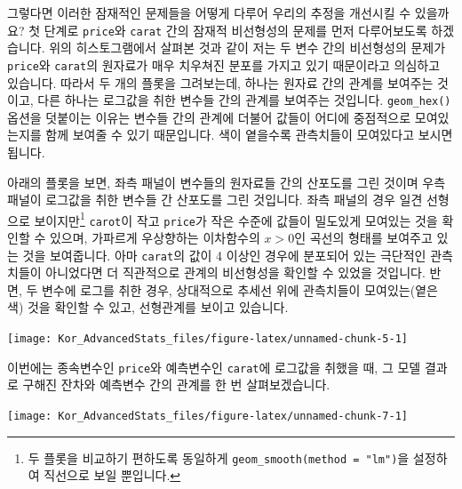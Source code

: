 \documentclass[
]{book}
\newenvironment{Shaded}{\begin{snugshade}}{\end{snugshade}}
\newcommand{\DataTypeTok}[1]{\textcolor[rgb]{0.13,0.29,0.53}{#1}}
\newcommand{\KeywordTok}[1]{\textcolor[rgb]{0.13,0.29,0.53}{\textbf{#1}}}
\newcommand{\NormalTok}[1]{#1}
\newcommand{\OperatorTok}[1]{\textcolor[rgb]{0.81,0.36,0.00}{\textbf{#1}}}
\newcommand{\StringTok}[1]{\textcolor[rgb]{0.31,0.60,0.02}{#1}}
\begin{document}
그렇다면 이러한 잠재적인 문제들을 어떻게 다루어 우리의 추정을 개선시킬 수 있을까요? 첫 단계로 \texttt{price}와 \texttt{carat} 간의 잠재적 비선형성의 문제를 먼저 다루어보도록 하겠습니다. 위의 히스토그램에서 살펴본 것과 같이 저는 두 변수 간의 비선형성의 문제가 \texttt{price}와 \texttt{carat}의 원자료가 매우 치우쳐진 분포를 가지고 있기 때문이라고 의심하고 있습니다. 따라서 두 개의 플롯을 그려보는데, 하나는 원자료 간의 관계를 보여주는 것이고, 다른 하나는 로그값을 취한 변수들 간의 관계를 보여주는 것입니다. \texttt{geom\_hex()} 옵션을 덧붙이는 이유는 변수들 간의 관계에 더불어 값들이 어디에 중점적으로 모여있는지를 함께 보여줄 수 있기 때문입니다. 색이 옅을수록 관측치들이 모여있다고 보시면 됩니다.

아래의 플롯을 보면, 좌측 패널이 변수들의 원자료들 간의 산포도를 그린 것이며 우측 패널이 로그값을 취한 변수들 간 산포도를 그린 것입니다. 좌측 패널의 경우 일견 선형으로 보이지만\footnote{두 플롯을 비교하기 편하도록 동일하게 \texttt{geom\_smooth(method\ =\ "lm")}을 설정하여 직선으로 보일 뿐입니다.} \texttt{carot}이 작고 \texttt{price}가 작은 수준에 값들이 밀도있게 모여있는 것을 확인할 수 있으며, 가파르게 우상향하는 이차함수의 \(x>0\)인 곡선의 형태를 보여주고 있는 것을 보여줍니다. 아마 \texttt{carat}의 값이 4 이상인 경우에 분포되어 있는 극단적인 관측치들이 아니었다면 더 직관적으로 관계의 비선형성을 확인할 수 있었을 것입니다. 반면, 두 변수에 로그를 취한 경우, 상대적으로 추세선 위에 관측치들이 모여있는(옅은 색) 것을 확인할 수 있고, 선형관계를 보이고 있습니다.

\begin{center}\texttt{[image: Kor\_AdvancedStats\_files/figure-latex/unnamed-chunk-5-1]} \end{center}

이번에는 종속변수인 \texttt{price}와 예측변수인 \texttt{carat}에 로그값을 취했을 때, 그 모델 결과로 구해진 잔차와 예측변수 간의 관계를 한 번 살펴보겠습니다.

\begin{Shaded}
\end{Shaded}

\begin{center}\texttt{[image: Kor\_AdvancedStats\_files/figure-latex/unnamed-chunk-7-1]} \end{center}
\end{document}

